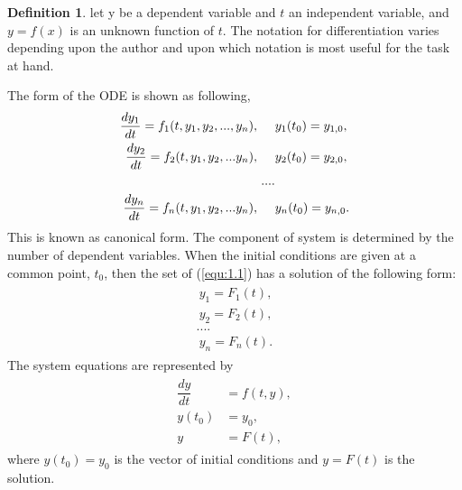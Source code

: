 \documentclass[a4paper]{report}
\theoremstyle{definition}
\newtheorem{defn}[thm]{Definition}
\begin{document}
\vspace{4mm}
\begin{mdframed}[backgroundcolor=airforceblue!25] 
\begin{defn} \label{def1}
let y be a dependent variable and $t$ an independent variable, and $y = f(x)$ is an unknown function of $t$. The notation for differentiation varies depending upon the author and upon which notation is most useful for the task at hand.  
\newline
\end{defn}
\end{mdframed}
The form of the ODE is shown as following,
\smallskip
\begin{align}
\label{equ:1.1}
\begin{split}
\dfrac{dy_1}{dt}=f_1(t,y_1,y_2,...,y_n) , \hspace{5mm} &y_1(t_0)=y_{1,0} ,
\\
\dfrac{dy_2}{dt}=f_2(t,y_1,y_2,...y_n) ,\hspace{5mm} &y_2(t_0)=y_{2,0},
\\
....
\\
\dfrac{dy_n}{dt}=f_n(t,y_1,y_2,...y_n), \hspace{5mm} &y_n(t_0)=y_{n,0}.
\end{split}
\end{align}
This is known as  canonical form.
The component of system is determined by the number of dependent variables. When the initial conditions are given at a common point, $t_0$, then the set of (\ref{equ:1.1}) has a solution of the following form:
\begin{align}
\begin{split}
 \ y_{1}=F_1(t), 
\\
 \ y_{2}=F_2(t),
\\....
\\
 \ y_{n}=F_n(t).
\end{split}
\end{align}
The system equations are represented by
\begin{align}
\begin{split}
\dfrac{dy}{dt}&=f(t,y),
\\
y(t_0)&=y_0,
\\
y&=F(t),
\end{split}
\end{align}
where $y(t_0)=y_0$ is the vector of initial conditions and $y=F(t)$ is the  solution.
  
\end{document}
